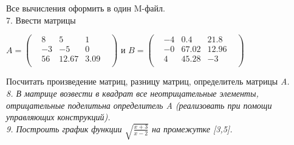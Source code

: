 \documentclass[12pt]{article}
\begin{document}
Все вычисления оформить в один M-файл.\\
7. Ввести матрицы\\
\begin {center}
$ A =
\begin{pmatrix} 
& 8 & 5 & 1 &\\
& -3 & -5 & 0 &\\
& 56 & 12.67 & 3.09 &\\
\end{pmatrix}
$
\quad и \quad
$ B =
\begin{pmatrix} 
& -4 & 0.4 & 21.8 &\\
& -0 & 67.02 & 12.96 &\\
& 4 & 45.28 & -3 &\\
\end{pmatrix}
$
\end {center}
Посчитать произведение матриц, разницу матриц, определитель матрицы \it A\rm.\\
8. В матрице возвести в квадрат все неотрицательные элементы, отрицательные поделить\linebreak на определитель \it A \rm (реализовать при помощи управляющих конструкций).\\
9. Построить график функции $ \sqrt{\frac{x+3}{x-2}} $ на промежутке [3,5].
\end{document}
